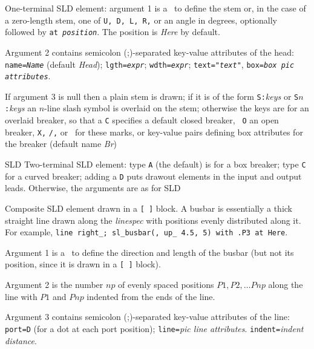   {One-terminal SLD element: argument 1 is a \linespec\ to define the stem
   or, in the case of a zero-length stem, one of {\tt U, D, L, R,} or an
   angle in degrees, optionally followed by {\tt at {\sl position}}.
   The position is {\sl Here} by default.

   Argument 2 contains semicolon (;)-separated key-value attributes
   of the head:
   {\tt name={\sl{}Name}} (default {\sl Head});
   {\tt lgth={\sl{}expr}};
   {\tt wdth={\sl{}expr}};
   {\tt text="{\sl{}text}"},
   {\tt box={\sl{}box pic attributes}}.

   If argument 3 is null then a plain stem is drawn; if it is of the
   form {\tt S:}{\sl keys} or {\tt S$n$:}{\sl keys} an $n$-line slash
   symbol is overlaid on the stem; otherwise the keys are for an overlaid
   breaker, so that a {\tt C} specifies a default closed breaker, {\tt
   O} an open breaker, {\tt X,} {\tt /,} or \bsl\ for these marks, or
    key-value pairs defining box attributes
   for the breaker (default name {\sl Br})

   }
  {SLD}
  {Two-terminal SLD element:
   type {\tt A} (the default) is for a box breaker; type 
   {\tt C} for a curved breaker; adding a {\tt D} puts drawout elements
   in the input and output leads.
   Otherwise, the arguments are as for 
   }
  {SLD}
  {Composite SLD element drawn in a {\tt [ ]} block.  A busbar is
   essentially a thick straight line 
   drawn along the {\sl linespec} with positions evenly distributed
   along it.  For example,
     {\tt line right\_; sl\_busbar(, up\_ 4.5, 5) with .P3 at Here}.

   Argument 1 is a \linespec\ to define the direction and length of the
     busbar (but not its position, since it is drawn in a {\tt [ ]} block).

   Argument 2 is the number $np$ of evenly spaced positions
     $P1, P2, \ldots Pnp$ along the line with $P1$ and $Pnp$ indented
     from the ends of the line.

   Argument 3 contains semicolon (;)-separated key-value attributes
     of the line:
   {\tt port=D} (for a dot at each port position);
   {\tt line=}{\sl pic line attributes}.
   {\tt indent=}{\sl indent distance}.
   }
